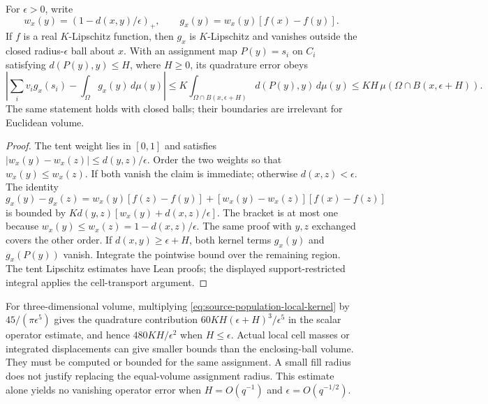 \begin{proposition}
\label{prop:source-population-local-kernel}
For $\epsilon>0$, write
\[
 w_x(y)=(1-d(x,y)/\epsilon)_+,
 \qquad g_x(y)=w_x(y)[f(x)-f(y)].
\]
If $f$ is a real $K$-Lipschitz function, then $g_x$ is $K$-Lipschitz
and vanishes outside the closed radius-$\epsilon$ ball about $x$.
With an assignment map $P(y)=s_i$ on $C_i$ satisfying
$d(P(y),y)\le H$, where $H\ge0$, its quadrature error obeys
\begin{equation}
 \left|\sum_i v_i g_x(s_i)-\int_\Omega g_x(y)\,d\mu(y)\right|
 \le K\!\int_{\Omega\cap B(x,\epsilon+H)}
                      d(P(y),y)\,d\mu(y)
 \le KH\,\mu(\Omega\cap B(x,\epsilon+H)).
 \label{eq:source-population-local-kernel}
\end{equation}
The same statement holds with closed balls; their boundaries are irrelevant
for Euclidean volume.
\end{proposition}
\begin{proof}
The tent weight lies in $[0,1]$ and satisfies
$|w_x(y)-w_x(z)|\le d(y,z)/\epsilon$. Order the two weights so that
$w_x(y)\le w_x(z)$. If both vanish the claim is immediate; otherwise
$d(x,z)<\epsilon$. The identity
\[
 g_x(y)-g_x(z)
 =w_x(y)[f(z)-f(y)]
  +[w_x(y)-w_x(z)][f(x)-f(z)]
\]
is bounded by
$Kd(y,z)[w_x(y)+d(x,z)/\epsilon]$. The bracket is at most one because
$w_x(y)\le w_x(z)=1-d(x,z)/\epsilon$. The same proof with $y,z$
exchanged covers the other order. If $d(x,y)\ge\epsilon+H$, both kernel terms
$g_x(y)$ and $g_x(P(y))$ vanish. Integrate the pointwise bound over the
remaining region. The tent Lipschitz estimates have Lean proofs; the
displayed support-restricted integral applies the cell-transport argument.
\end{proof}

For three-dimensional volume, multiplying
\eqref{eq:source-population-local-kernel} by $45/(\pi\epsilon^5)$ gives
the quadrature contribution
$60KH(\epsilon+H)^3/\epsilon^5$ in the scalar operator estimate,
and hence $480KH/\epsilon^2$ when $H\le\epsilon$.
Actual local cell masses or integrated displacements can give smaller
bounds than the enclosing-ball volume. They must be computed or bounded
for the same assignment. A small fill radius does not justify replacing
the equal-volume assignment radius. This estimate alone yields no vanishing
operator error when $H=O(q^{-1})$ and $\epsilon=O(q^{-1/2})$.

